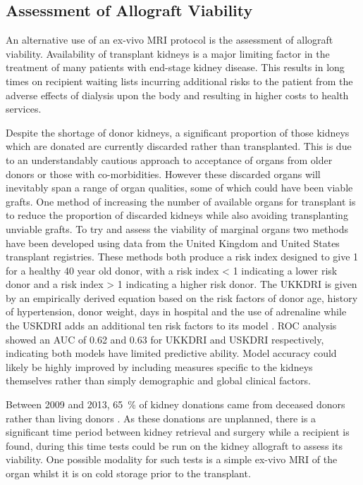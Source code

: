 \newpage
\subsection{Assessment of Allograft Viability}
An alternative use of an ex-vivo \ac{MRI} protocol is the assessment of allograft viability. Availability of transplant kidneys is a major limiting factor in the treatment of many patients with end-stage kidney disease. This results in long times on recipient waiting lists incurring additional risks to the patient from the adverse effects of dialysis upon the body and resulting in higher costs to health services. 

Despite the shortage of donor kidneys, a significant proportion of those kidneys which are donated are currently discarded rather than transplanted. This is due to an understandably cautious approach to acceptance of organs from older donors or those with co-morbidities. However these discarded organs will inevitably span a range of organ qualities, some of which could have been viable grafts. One method of increasing the number of available organs for transplant is to reduce the proportion of discarded kidneys while also avoiding transplanting unviable grafts. To try and assess the viability of marginal organs two methods have been developed using data from the United Kingdom and United States transplant registries. These methods both produce a risk index designed to give 1 for a healthy 40 year old donor, with a risk index < 1 indicating a lower risk donor and a risk index > 1 indicating a higher risk donor. The \ac{UKKDRI} is given by an empirically derived equation based on the risk factors of donor age, history of hypertension, donor weight, days in hospital and the use of adrenaline \cite{watson_simplified_2012} while the \ac{USKDRI} adds an additional ten risk factors to its model \cite{rao_comprehensive_2009}. \ac{ROC} analysis showed an \ac{AUC} of 0.62 and 0.63 for \ac{UKKDRI} and \ac{USKDRI} respectively, indicating both models have limited predictive ability. Model accuracy could likely be highly improved by including measures specific to the kidneys themselves rather than simply demographic and global clinical factors.

\newpage
Between 2009 and 2013, 65~\% of kidney donations came from deceased donors rather than living donors \cite{burton_causes_2019}. As these donations are unplanned, there is a significant time period between kidney retrieval and surgery while a recipient is found, during this time tests could be run on the kidney allograft to assess its viability. One possible modality for such tests is a simple ex-vivo \ac{MRI} of the organ whilst it is on cold storage prior to the transplant.

